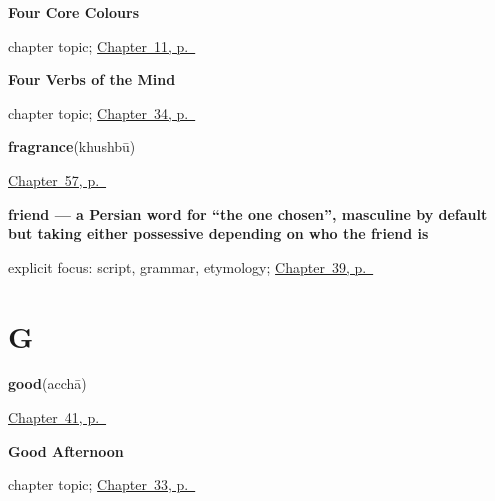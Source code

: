 \noindent\begin{minipage}[t]{\linewidth}
\raggedright
\textbf{Four Core Colours}\par
\footnotesize chapter topic; \hyperref[ch:hi-core-colours]{Chapter~11, p.~\pageref*{ch:hi-core-colours}}
\end{minipage}\par\smallskip

\noindent\begin{minipage}[t]{\linewidth}
\raggedright
\textbf{Four Verbs of the Mind}\par
\footnotesize chapter topic; \hyperref[ch:hi-verbs-of-the-mind]{Chapter~34, p.~\pageref*{ch:hi-verbs-of-the-mind}}
\end{minipage}\par\smallskip

\noindent\begin{minipage}[t]{\linewidth}
\raggedright
\textbf{fragrance}\enspace\emph{}\enspace(khushbū)\par
\footnotesize \hyperref[ch:hi-a-gift-and-a-feast]{Chapter~57, p.~\pageref*{ch:hi-a-gift-and-a-feast}}
\end{minipage}\par\smallskip

\noindent\begin{minipage}[t]{\linewidth}
\raggedright
\textbf{friend — a Persian word for \textquotedblleft{}the one chosen\textquotedblright{}, masculine by default but taking either possessive depending on who the friend is}\enspace\emph{}\par
\footnotesize explicit focus: script, grammar, etymology; \hyperref[ch:hi-people-around-you]{Chapter~39, p.~\pageref*{ch:hi-people-around-you}}
\end{minipage}\par\smallskip

\section*{G}

\noindent\begin{minipage}[t]{\linewidth}
\raggedright
\textbf{good}\enspace\emph{}\enspace(acchā)\par
\footnotesize \hyperref[ch:hi-describing-things]{Chapter~41, p.~\pageref*{ch:hi-describing-things}}
\end{minipage}\par\smallskip

\noindent\begin{minipage}[t]{\linewidth}
\raggedright
\textbf{Good Afternoon}\par
\footnotesize chapter topic; \hyperref[ch:hi-good-afternoon]{Chapter~33, p.~\pageref*{ch:hi-good-afternoon}}
\end{minipage}\par\smallskip

